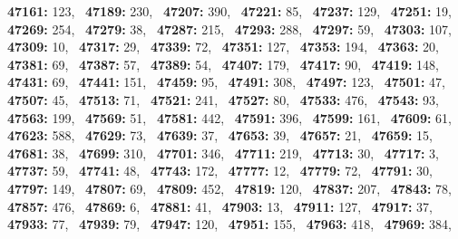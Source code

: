 \textbf{47161:} 123,\allowbreak~ 
\textbf{47189:} 230,\allowbreak~ 
\textbf{47207:} 390,\allowbreak~ 
\textbf{47221:} 85,\allowbreak~ 
\textbf{47237:} 129,\allowbreak~ 
\textbf{47251:} 19,\allowbreak~ 
\textbf{47269:} 254,\allowbreak~ 
\textbf{47279:} 38,\allowbreak~ 
\textbf{47287:} 215,\allowbreak~ 
\textbf{47293:} 288,\allowbreak~ 
\textbf{47297:} 59,\allowbreak~ 
\textbf{47303:} 107,\allowbreak~ 
\textbf{47309:} 10,\allowbreak~ 
\textbf{47317:} 29,\allowbreak~ 
\textbf{47339:} 72,\allowbreak~ 
\textbf{47351:} 127,\allowbreak~ 
\textbf{47353:} 194,\allowbreak~ 
\textbf{47363:} 20,\allowbreak~ 
\textbf{47381:} 69,\allowbreak~ 
\textbf{47387:} 57,\allowbreak~ 
\textbf{47389:} 54,\allowbreak~ 
\textbf{47407:} 179,\allowbreak~ 
\textbf{47417:} 90,\allowbreak~ 
\textbf{47419:} 148,\allowbreak~ 
\textbf{47431:} 69,\allowbreak~ 
\textbf{47441:} 151,\allowbreak~ 
\textbf{47459:} 95,\allowbreak~ 
\textbf{47491:} 308,\allowbreak~ 
\textbf{47497:} 123,\allowbreak~ 
\textbf{47501:} 47,\allowbreak~ 
\textbf{47507:} 45,\allowbreak~ 
\textbf{47513:} 71,\allowbreak~ 
\textbf{47521:} 241,\allowbreak~ 
\textbf{47527:} 80,\allowbreak~ 
\textbf{47533:} 476,\allowbreak~ 
\textbf{47543:} 93,\allowbreak~ 
\textbf{47563:} 199,\allowbreak~ 
\textbf{47569:} 51,\allowbreak~ 
\textbf{47581:} 442,\allowbreak~ 
\textbf{47591:} 396,\allowbreak~ 
\textbf{47599:} 161,\allowbreak~ 
\textbf{47609:} 61,\allowbreak~ 
\textbf{47623:} 588,\allowbreak~ 
\textbf{47629:} 73,\allowbreak~ 
\textbf{47639:} 37,\allowbreak~ 
\textbf{47653:} 39,\allowbreak~ 
\textbf{47657:} 21,\allowbreak~ 
\textbf{47659:} 15,\allowbreak~ 
\textbf{47681:} 38,\allowbreak~ 
\textbf{47699:} 310,\allowbreak~ 
\textbf{47701:} 346,\allowbreak~ 
\textbf{47711:} 219,\allowbreak~ 
\textbf{47713:} 30,\allowbreak~ 
\textbf{47717:} 3,\allowbreak~ 
\textbf{47737:} 59,\allowbreak~ 
\textbf{47741:} 48,\allowbreak~ 
\textbf{47743:} 172,\allowbreak~ 
\textbf{47777:} 12,\allowbreak~ 
\textbf{47779:} 72,\allowbreak~ 
\textbf{47791:} 30,\allowbreak~ 
\textbf{47797:} 149,\allowbreak~ 
\textbf{47807:} 69,\allowbreak~ 
\textbf{47809:} 452,\allowbreak~ 
\textbf{47819:} 120,\allowbreak~ 
\textbf{47837:} 207,\allowbreak~ 
\textbf{47843:} 78,\allowbreak~ 
\textbf{47857:} 476,\allowbreak~ 
\textbf{47869:} 6,\allowbreak~ 
\textbf{47881:} 41,\allowbreak~ 
\textbf{47903:} 13,\allowbreak~ 
\textbf{47911:} 127,\allowbreak~ 
\textbf{47917:} 37,\allowbreak~ 
\textbf{47933:} 77,\allowbreak~ 
\textbf{47939:} 79,\allowbreak~ 
\textbf{47947:} 120,\allowbreak~ 
\textbf{47951:} 155,\allowbreak~ 
\textbf{47963:} 418,\allowbreak~ 
\textbf{47969:} 384,\allowbreak~ 

